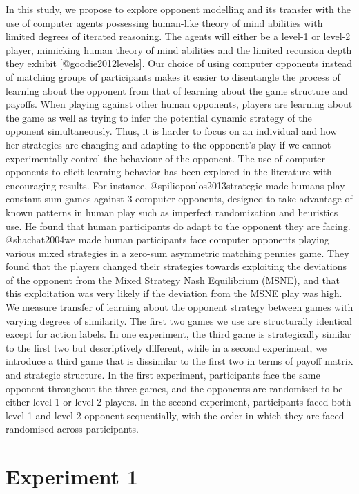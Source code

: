 \documentclass[man,floatsintext]{apa6}
\begin{document}
In this study, we propose to explore opponent modelling and its transfer with the use of computer agents possessing human-like theory of mind abilities with limited degrees of iterated reasoning. The agents will either be a level-1 or level-2 player, mimicking human theory of mind abilities and the limited recursion depth they exhibit {[}@goodie2012levels{]}. Our choice of using computer opponents instead of matching groups of participants makes it easier to disentangle the process of learning about the opponent from that of learning about the game structure and payoffs. When playing against other human opponents, players are learning about the game as well as trying to infer the potential dynamic strategy of the opponent simultaneously. Thus, it is harder to focus on an individual and how her strategies are changing and adapting to the opponent's play if we cannot experimentally control the behaviour of the opponent. The use of computer opponents to elicit learning behavior has been explored in the literature with encouraging results. For instance, @spiliopoulos2013strategic made humans play constant sum games against 3 computer opponents, designed to take advantage of known patterns in human play such as imperfect randomization and heuristics use. He found that human participants do adapt to the opponent they are facing. @shachat2004we made human participants face computer opponents playing various mixed strategies in a zero-sum asymmetric matching pennies game. They found that the players changed their strategies towards exploiting the deviations of the opponent from the Mixed Strategy Nash Equilibrium (MSNE), and that this exploitation was very likely if the deviation from the MSNE play was high.
We measure transfer of learning about the opponent strategy between games with varying degrees of similarity. The first two games we use are structurally identical except for action labels. In one experiment, the third game is strategically similar to the first two but descriptively different, while in a second experiment, we introduce a third game that is dissimilar to the first two in terms of payoff matrix and strategic structure. In the first experiment, participants face the same opponent throughout the three games, and the opponents are randomised to be either level-1 or level-2 players. In the second experiment, participants faced both level-1 and level-2 opponent sequentially, with the order in which they are faced randomised across participants.

\newpage

\hypertarget{experiment-1}{%
\section{Experiment 1}\label{experiment-1}}
\end{document}
